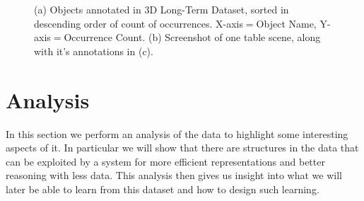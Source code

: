 \documentclass[letterpaper, 10 pt, conference]{ieeeconf}
\begin{document}
\begin{figure}[t]
\begin{center}
\\
\\
\caption{(a) Objects annotated in 3D Long-Term Dataset, sorted in descending order of count of occurrences. X-axis$=$Object Name, Y-axis$=$Occurrence Count. (b) Screenshot of one table scene, along with it's annotations in (c).}
\end{center}
\end{figure}


\section{Analysis}
\label{sec:Analysis}
In this section we perform an analysis of the data to highlight some
interesting aspects of it. In particular we will show that there are
structures in the data that can be exploited by a system for more
efficient representations and better reasoning with less data.  This
analysis then gives us insight into what we will later be able to
learn from this dataset and how to design such learning.
\end{document}
